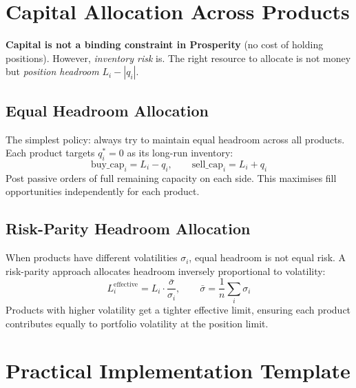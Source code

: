 \documentclass[12pt,a4paper,openany]{report}
\theoremstyle{definition}
\begin{document}
\section{Capital Allocation Across Products}

\textbf{Capital is not a binding constraint in Prosperity} (no cost of holding positions). However, \emph{inventory risk} is. The right resource to allocate is not money but \emph{position headroom} $L_i - |q_i|$.

\subsection{Equal Headroom Allocation}

The simplest policy: always try to maintain equal headroom across all products. Each product targets $q_i^* = 0$ as its long-run inventory:
\[
  \text{buy\_cap}_i = L_i - q_i, \qquad \text{sell\_cap}_i = L_i + q_i
\]
Post passive orders of full remaining capacity on each side. This maximises fill opportunities independently for each product.

\subsection{Risk-Parity Headroom Allocation}

When products have different volatilities $\sigma_i$, equal headroom is not equal risk. A risk-parity approach allocates headroom inversely proportional to volatility:
\[
  L_i^{\text{effective}} = L_i \cdot \frac{\bar{\sigma}}{\sigma_i}, \qquad \bar{\sigma} = \frac{1}{n}\sum_i \sigma_i
\]
Products with higher volatility get a tighter effective limit, ensuring each product contributes equally to portfolio volatility at the position limit.

\section{Practical Implementation Template}
\end{document}

